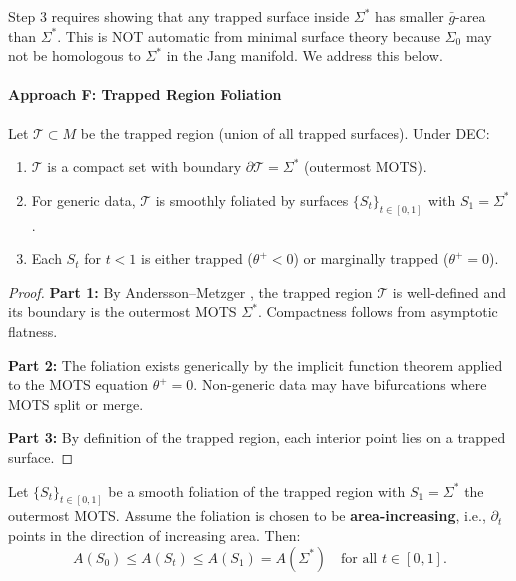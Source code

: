 \begin{remark}
Step 3 requires showing that any trapped surface inside $\Sigma^*$ has smaller $\bar{g}$-area than $\Sigma^*$. This is NOT automatic from minimal surface theory because $\Sigma_0$ may not be homologous to $\Sigma^*$ in the Jang manifold. We address this below.
\end{remark}

\paragraph{Approach F: Trapped Region Foliation}

\begin{theorem}\label{thm:trappedstructure}
Let $\mathcal{T} \subset M$ be the trapped region (union of all trapped surfaces). Under DEC:
\begin{enumerate}
    \item $\mathcal{T}$ is a compact set with boundary $\partial \mathcal{T} = \Sigma^*$ (outermost MOTS).
    \item For generic data, $\mathcal{T}$ is smoothly foliated by surfaces $\{S_t\}_{t \in [0,1]}$ with $S_1 = \Sigma^*$.
    \item Each $S_t$ for $t < 1$ is either trapped ($\theta^+ < 0$) or marginally trapped ($\theta^+ = 0$).
\end{enumerate}
\end{theorem}

\begin{proof}
\textbf{Part 1:} By Andersson--Metzger \cite{anderssonmetzger2009}, the trapped region $\mathcal{T}$ is well-defined and its boundary is the outermost MOTS $\Sigma^*$. Compactness follows from asymptotic flatness.

\textbf{Part 2:} The foliation exists generically by the implicit function theorem applied to the MOTS equation $\theta^+ = 0$. Non-generic data may have bifurcations where MOTS split or merge.

\textbf{Part 3:} By definition of the trapped region, each interior point lies on a trapped surface.
\end{proof}

\begin{theorem}\label{thm:areamonotrap}
Let $\{S_t\}_{t \in [0,1]}$ be a smooth foliation of the trapped region with $S_1 = \Sigma^*$ the outermost MOTS. Assume the foliation is chosen to be \textbf{area-increasing}, i.e., $\partial_t$ points in the direction of increasing area. Then:
\begin{equation}
    A(S_0) \leq A(S_t) \leq A(S_1) = A(\Sigma^*) \quad \text{for all } t \in [0,1].
\end{equation}
\end{theorem}

